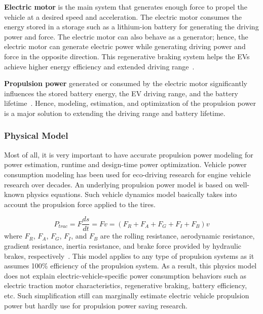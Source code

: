 \textbf{Electric motor} is the main system that generates enough force to propel the vehicle at a desired speed and acceleration. The electric motor consumes the energy stored in a storage such as a lithium-ion battery for generating the driving power and force. The electric motor can also behave as a generator; hence, the electric motor can generate electric power while generating driving power and force in the opposite direction. This regenerative braking system helps the EVs achieve higher energy efficiency and extended driving range~\cite{AF_5,AF_6,AF_7}.

\textbf{Propulsion power} generated or consumed by the electric motor significantly influences the stored battery energy, the EV driving range, and the battery lifetime~\cite{AF_8,AF_9,AF_10}. Hence, modeling, estimation, and optimization of the propulsion power is a major solution to extending the driving range and battery lifetime.


\subsubsection{Physical Model} \label{subsubsec:physical_model}

Most of all, it is very important to have accurate propulsion power modeling for power estimation, runtime and design-time power optimization. Vehicle power consumption modeling has been used for eco-driving research for engine vehicle research over decades. An underlying propulsion power model is based on well-known physics equations. Such vehicle dynamics model basically takes into account the propulsion force applied to the tires.

\begin{equation} \label{eq:traction_model}
P_{trac} = F \frac{ds}{dt} = Fv= (F_{R} + F_{A} + F_{G} + F_{I} + F_{B}) v
\end{equation}
%
where $F_R$, $F_A$, $F_G$, $F_I$, and $F_B$ are the rolling resistance, aerodynamic resistance, gradient resistance, inertia resistance, and brake force provided by hydraulic brakes, respectively~\cite{Chang:ICCAD14, Park:DAC13}. This model applies to any type of propulsion systems as it assumes 100\% efficiency of the propulsion system. As a result, this physics model does not explain electric-vehicle-specific power consumption behaviors such as electric traction motor characteristics, regenerative braking, battery efficiency, etc. Such simplification still can marginally estimate electric vehicle propulsion power but hardly use for propulsion power saving research.

